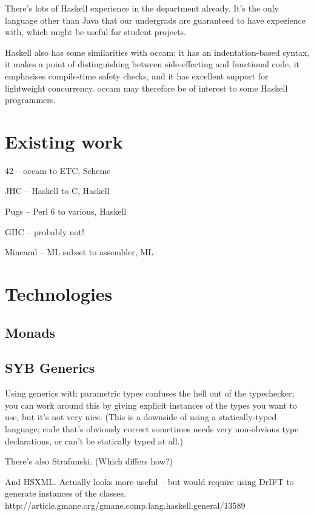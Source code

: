 \documentclass[a4paper,12pt]{article}
\def\occam{{\sffamily occam}\xspace}
\begin{document}
There's lots of Haskell experience in the department already. It's the
only language other than Java that our undergrads are guaranteed to have
experience with, which might be useful for student projects.

Haskell also has some similarities with \occam: it has an
indentation-based syntax, it makes a point of distinguishing between
side-effecting and functional code, it emphasises compile-time safety
checks, and it has excellent support for lightweight concurrency. \occam
may therefore be of interest to some Haskell programmers.

\section{Existing work}

42 -- \occam to ETC, Scheme

JHC -- Haskell to C, Haskell

Pugs -- Perl 6 to various, Haskell

GHC -- probably not!

Mincaml -- ML subset to assembler, ML

\section{Technologies}

\subsection{Monads}

\subsection{SYB Generics}

\cite{syb1}

\label{gen-par-prob} Using generics with parametric types confuses the
hell out of the typechecker; you can work around this by giving explicit
instances of the types you want to use, but it's not very nice.
(This is a downside of using a statically-typed language; code that's
obviously correct sometimes needs very non-obvious type declarations, or
can't be statically typed at all.)

There's also Strafunski. (Which differs how?)

And HSXML. Actually looks more useful -- but would require using DrIFT
to generate instances of the classes.
http://article.gmane.org/gmane.comp.lang.haskell.general/13589
\end{document}
